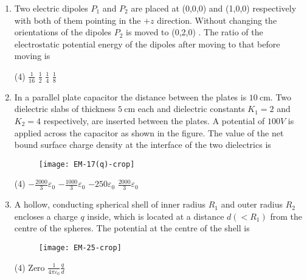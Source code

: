 \begin{enumerate}[label=\color{ocre}\textbf{\arabic*.}]
	
	\item Two electric dipoles $P_{1}$ and $P_{2}$ are placed at (0,0,0) and (1,0,0) respectively with both of them pointing in the $+z$ direction. Without changing the orientations of the dipoles $P_{2}$ is moved to (0,2,0) . The ratio of the electrostatic potential energy of the dipoles after moving to that before moving is
	{}
	\begin{tasks}(4)
		\task[\textbf{a.}] $\frac{1}{16}$
		\task[\textbf{b.}] $\frac{1}{2}$
		\task[\textbf{c.}] $\frac{1}{4}$
		\task[\textbf{d.}] $\frac{1}{8}$
	\end{tasks}
		\item In a parallel plate capacitor the distance between the plates is $10 \mathrm{~cm}$. Two dielectric slabs of thickness $5 \mathrm{~cm}$ each and dielectric constants $K_{1}=2$ and $K_{2}=4$ respectively, are inserted between the plates. A potential of $100 V$ is applied across the capacitor as shown in the figure. The value of the net bound surface charge density at the interface of the two dielectrics is {}
	\begin{figure}[H]
		\begin{center}
			\texttt{[image: EM-17(q)-crop]}
		\end{center}
	\end{figure}
	\begin{tasks}(4)
		\task[\textbf{a.}] $-\frac{2000}{3} \varepsilon_{0}$
		\task[\textbf{b.}] $-\frac{1000}{3} \varepsilon_{0}$
		\task[\textbf{c.}] $-250 \varepsilon_{0}$
		\task[\textbf{d.}] $\frac{2000}{3} \varepsilon_{0}$
	\end{tasks}
	\item   A hollow, conducting spherical shell of inner radius $R_{1}$ and outer radius $R_{2}$ encloses a charge $q$ inside, which is located at a distance $d\left(<R_{1}\right)$ from the centre of the spheres. The potential at the centre of the shell is {}
	\begin{figure}[H]
		\begin{center}
			\texttt{[image: EM-25-crop]}
		\end{center}
	\end{figure}
	\begin{tasks}(4)
		\task[\textbf{a.}] Zero
		\task[\textbf{b.}] $\frac{1}{4 \pi \varepsilon_{0}} \frac{q}{d}$

\end{tasks}
\end{enumerate}
